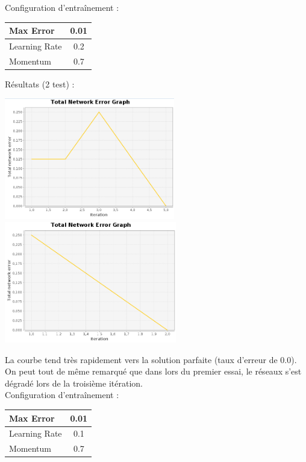 \documentclass[10pt]{report}
\begin{document}
Configuration d'entraînement :\\
\begin{tabular}{|l|c|}
	\hline
	Max Error & 0.01 \\
	\hline
	Learning Rate & 0.2 \\
	\hline
	Momentum & 0.7 \\
	\hline
\end{tabular}

Résultats (2 test) :\\
\begin{center}
\includegraphics[height=200px]{img/AND_EG_1.png}\\
\includegraphics[height=200px]{img/AND_EG_2.png}\\
\end{center}

La courbe tend très rapidement vers la solution parfaite (taux d'erreur de 0.0). On peut tout de même remarqué que dans lors du premier essai, le réseaux s'est dégradé lors de la troisième itération.\\

Configuration d'entraînement :\\
\begin{tabular}{|l|c|}
	\hline
	Max Error & 0.01 \\
	\hline
	Learning Rate & 0.1 \\
	\hline
	Momentum & 0.7 \\
	\hline
\end{tabular}
\end{document}
